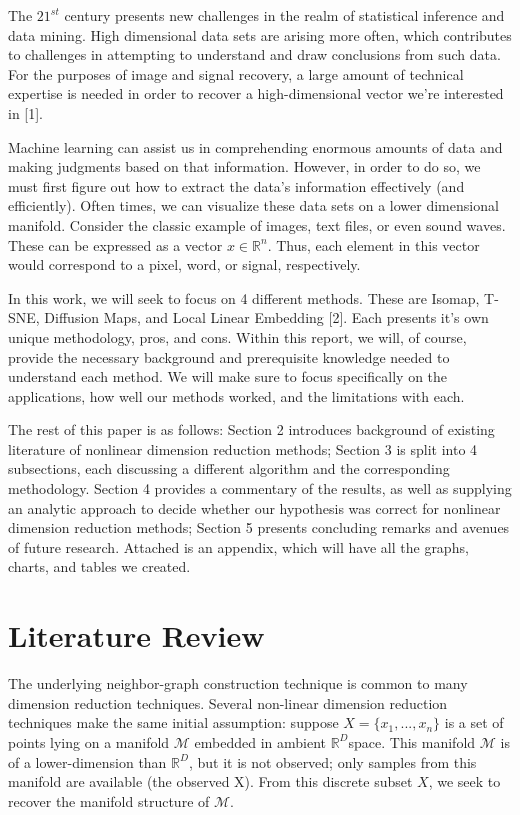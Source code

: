 \documentclass[11pt]{article}
\begin{document}
\hspace{5mm}The $21^{st}$ century presents new challenges in the realm of statistical inference and data mining. High dimensional data sets are arising more often, which contributes to challenges in attempting to understand and draw conclusions from such data. For the purposes of image and signal recovery, a large amount of technical expertise is needed in order to recover a high-dimensional vector we're interested in [1].

Machine learning can assist us in comprehending enormous amounts of data and making judgments based on that information. However, in order to do so, we must first figure out how to extract the data's information effectively (and efficiently). Often times, we can visualize these data sets on a lower dimensional manifold. Consider the classic example of images, text files, or even sound waves. These can be expressed as a vector $x\in\mathbb{R}^n$. Thus, each element in this vector would correspond to a pixel, word, or signal, respectively.

In this work, we will seek to focus on 4 different methods. These are Isomap, T-SNE, Diffusion Maps, and Local Linear Embedding [2]. Each presents it's own unique methodology, pros, and cons. Within this report, we will, of course, provide the necessary background and prerequisite knowledge needed to understand each method. We will make sure to focus specifically on the applications, how well our methods worked, and the limitations with each. 

The rest of this paper is as follows: Section 2 introduces background of existing literature of nonlinear dimension reduction methods; Section 3 is split into 4 subsections, each discussing a different algorithm and the corresponding methodology. Section 4 provides a commentary of the results, as well as supplying an analytic approach to decide whether our hypothesis was correct for nonlinear dimension reduction methods; Section 5 presents concluding remarks and avenues of future research. Attached is an appendix, which will have all the graphs, charts, and tables we created.


\section{Literature Review}
\hspace{5mm}
The underlying neighbor-graph construction technique is common to many dimension reduction techniques.
Several non-linear dimension reduction techniques make the same initial assumption: suppose $X =\{x_1,..., x_n\}$ is a set of points lying on a manifold $\mathcal{M}$ embedded in ambient $\mathbb{R}^D$space. This manifold $\mathcal{M}$ is of a lower-dimension than $\mathbb{R}^D$, but it is not observed; only samples from this manifold are available (the observed X). From this discrete subset $X$, we seek to recover the manifold structure of $\mathcal{M}$.
\end{document}
